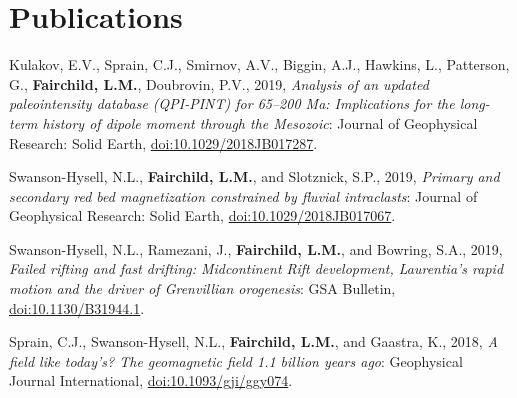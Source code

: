 \documentclass[11pt,letterpaper,sans]{moderncv}
\begin{document}


\section{Publications}
\begin{etaremune}[itemsep=3pt]

\item{Kulakov, E.V., Sprain, C.J., Smirnov, A.V., Biggin, A.J.,  Hawkins, L.,
     Patterson, G., \textbf{Fairchild, L.M.}, Doubrovin, P.V., 2019,
     \textit{Analysis of an updated paleointensity database (QPI-PINT) for
     65--200 Ma: Implications for the long-term history of dipole moment through
 the Mesozoic}: Journal of Geophysical Research: Solid Earth,
 {\color{cyan}\href{https://doi.org/10.1029/2018JB017287}
               {doi:10.1029/2018JB017287}}.}



 \item{Swanson-Hysell, N.L., \textbf{Fairchild, L.M.}, and Slotznick, S.P.,
         2019, \textit{Primary and secondary red bed magnetization constrained
         by fluvial intraclasts}: Journal of Geophysical Research: Solid Earth,
         {\color{cyan}\href{https://doi.org/10.1029/2018JB017067}
     {doi:10.1029/2018JB017067}}.}

 \item{Swanson-Hysell, N.L., Ramezani, J., \textbf{Fairchild, L.M.}, and
         Bowring, S.A., 2019, \textit{Failed rifting and fast drifting:
             Midcontinent Rift development, Laurentia's rapid motion and the
         driver of Grenvillian orogenesis}: GSA Bulletin,
         {\color{cyan}\href{https://doi.org/10.1130/B31944.1}
     {doi:10.1130/B31944.1}}.}

 \item{Sprain, C.J., Swanson-Hysell, N.L., \textbf{Fairchild, L.M.}, and
         Gaastra, K., 2018, \textit{A field like today's? The geomagnetic field
         1.1 billion years ago}: Geophysical Journal International,
         {\color{cyan}\href{https://doi.org/10.1093/gji/ggy074}
     {doi:10.1093/gji/ggy074}}.}


\end{etaremune}
\end{document}
